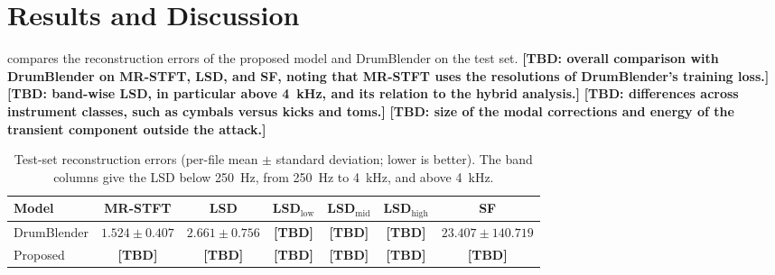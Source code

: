 \section{Results and Discussion}
\label{sec:results}
 compares the reconstruction errors of the proposed model and DrumBlender on the test set.
\textbf{[TBD: overall comparison with DrumBlender on MR-STFT, LSD, and SF, noting that MR-STFT uses the resolutions of DrumBlender's training loss.]}
\textbf{[TBD: band-wise LSD, in particular above 4~kHz, and its relation to the hybrid analysis.]}
\textbf{[TBD: differences across instrument classes, such as cymbals versus kicks and toms.]}
\textbf{[TBD: size of the modal corrections and energy of the transient component outside the attack.]}

\begin{table}[t]
\centering
\caption{Test-set reconstruction errors (per-file mean $\pm$ standard deviation; lower is better). The band columns give the LSD below 250~Hz, from 250~Hz to 4~kHz, and above 4~kHz.}
\label{tab:reconstruction-evaluation}
\footnotesize
\setlength{\tabcolsep}{4pt}
\begin{tabular}{lcccccc}
\hline
Model & MR-STFT & LSD & LSD$_{\mathrm{low}}$ & LSD$_{\mathrm{mid}}$ & LSD$_{\mathrm{high}}$ & SF \\
\hline
DrumBlender & $1.524 \pm 0.407$ & $2.661 \pm 0.756$ & \textbf{[TBD]} & \textbf{[TBD]} & \textbf{[TBD]} & $23.407 \pm 140.719$ \\
Proposed & \textbf{[TBD]} & \textbf{[TBD]} & \textbf{[TBD]} & \textbf{[TBD]} & \textbf{[TBD]} & \textbf{[TBD]} \\
\hline
\end{tabular}
\end{table}

